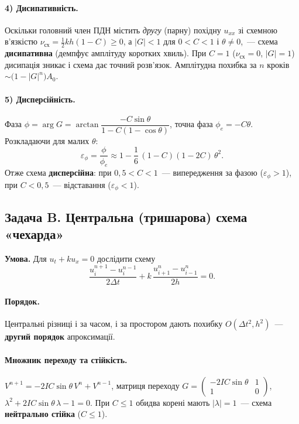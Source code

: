 \documentclass[12pt,a4paper]{article}
\theoremstyle{definition}
\theoremstyle{plain}
\newcommand{\abs}[1]{\left\lvert #1 \right\rvert}
\begin{document}
\paragraph{4) Дисипативність.} Оскільки головний член ПДН містить
\emph{другу} (парну) похідну $u_{xx}$ зі схемною в'язкістю
$\nu_{\text{сх}}=\tfrac12 kh(1-C)\ge0$, а $\abs{G}<1$ для $0<C<1$ і
$\theta\ne0$,~--- схема \textbf{дисипативна} (демпфує амплітуду коротких
хвиль). При $C=1$ ($\nu_{\text{сх}}=0$, $\abs{G}=1$) дисипація зникає і
схема дає точний розв'язок. Амплітудна похибка за $n$ кроків
$\sim\big(1-\abs{G}^n\big)A_0$.

\paragraph{5) Дисперсійність.} Фаза
$\phi=\arg G=\arctan\dfrac{-C\sin\theta}{1-C(1-\cos\theta)}$, точна фаза
$\phi_e=-C\theta$. Розкладаючи для малих $\theta$:
\begin{equation}
  \varepsilon_\phi=\frac{\phi}{\phi_e}
   \approx 1-\frac16\,(1-C)(1-2C)\,\theta^2 .
\end{equation}
Отже схема \textbf{дисперсійна}: при $0{,}5<C<1$~--- випередження за фазою
($\varepsilon_\phi>1$), при $C<0{,}5$~--- відставання ($\varepsilon_\phi<1$).

\subsection{Задача B. Центральна (тришарова) схема «чехарда»}
\textbf{Умова.} Для $u_t+k u_x=0$ дослідити схему
\[
  \frac{u_i^{n+1}-u_i^{n-1}}{2\Delta t}+k\,\frac{u_{i+1}^n-u_{i-1}^n}{2h}=0 .
\]

\paragraph{Порядок.} Центральні різниці і за часом, і за простором дають
похибку $O(\Delta t^2,h^2)$~--- \textbf{другий порядок} апроксимації.

\paragraph{Множник переходу та стійкість.} $V^{n+1}=-2IC\sin\theta\,V^n+V^{n-1}$,
матриця переходу
$G=\left(\begin{smallmatrix}-2IC\sin\theta & 1\\ 1 & 0\end{smallmatrix}\right)$,
$\lambda^2+2IC\sin\theta\,\lambda-1=0$. При $C\le1$ обидва корені мають
$\abs{\lambda}=1$~--- схема \textbf{нейтрально стійка} ($C\le1$).
\end{document}
